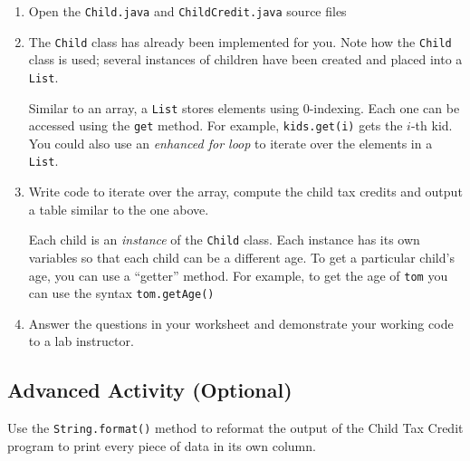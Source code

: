 \documentclass[12pt]{scrartcl}
\begin{document}
\begin{enumerate}
  \item Open the \texttt{Child.java} and 
  	\texttt{ChildCredit.java} source files
  \item The \texttt{Child} class has already been implemented
  	for you. Note how the \texttt{Child} class is used; several 
	instances of children have been created and placed into a
	\texttt{List}.  
	
	Similar to an array, a \texttt{List} stores elements using
	0-indexing.  Each one can be accessed using the \texttt{get}
	method.  For example, \texttt{kids.get(i)} gets the $i$-th
	kid.  You could also use an \emph{enhanced for loop} to iterate over
	the elements in a \texttt{List}.  
	
  \item Write code to iterate over the array, compute the child tax 
	credits and output a table similar to the one above.  
	
	Each child is an \emph{instance} of the \texttt{Child} class.
	Each instance has its own variables so that each child can be a
	different age.  To get a particular child's age, you can use a
	``getter'' method.  For example, to get the age of \texttt{tom}
	you can use the syntax \texttt{tom.getAge()}

  \item Answer the questions in your worksheet and demonstrate your 
  	working code to a lab instructor.
\end{enumerate}

\subsection*{Advanced Activity (Optional)}

Use the \texttt{String.format()} method to reformat the 
output of the Child Tax Credit program to print every piece of data 
in its own column.
\end{document}
